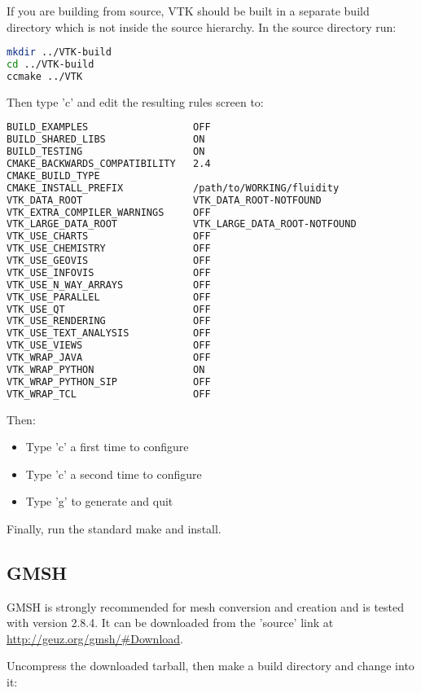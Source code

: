 If you are building from source, VTK should be built in a separate build
directory which is not inside the source hierarchy. In the source directory
run:

\begin{lstlisting}[language=bash]
mkdir ../VTK-build
cd ../VTK-build
ccmake ../VTK
\end{lstlisting}

Then type 'c' and edit the resulting rules screen to:

\begin{lstlisting}[language=bash]
BUILD_EXAMPLES                  OFF
BUILD_SHARED_LIBS               ON
BUILD_TESTING                   ON
CMAKE_BACKWARDS_COMPATIBILITY   2.4
CMAKE_BUILD_TYPE
CMAKE_INSTALL_PREFIX            /path/to/WORKING/fluidity
VTK_DATA_ROOT                   VTK_DATA_ROOT-NOTFOUND
VTK_EXTRA_COMPILER_WARNINGS     OFF
VTK_LARGE_DATA_ROOT             VTK_LARGE_DATA_ROOT-NOTFOUND
VTK_USE_CHARTS                  OFF
VTK_USE_CHEMISTRY               OFF
VTK_USE_GEOVIS                  OFF
VTK_USE_INFOVIS                 OFF
VTK_USE_N_WAY_ARRAYS            OFF
VTK_USE_PARALLEL                OFF
VTK_USE_QT                      OFF
VTK_USE_RENDERING               OFF
VTK_USE_TEXT_ANALYSIS           OFF
VTK_USE_VIEWS                   OFF
VTK_WRAP_JAVA                   OFF
VTK_WRAP_PYTHON                 ON
VTK_WRAP_PYTHON_SIP             OFF
VTK_WRAP_TCL                    OFF
\end{lstlisting}

Then:

\begin{itemize}
  \item Type 'c' a first time to configure
  \item Type 'c' a second time to configure
  \item Type 'g' to generate and quit
\end{itemize}

Finally, run the standard make and install.

\subsection{GMSH}
\label{sec:required_libraries_gmsh}

GMSH is strongly recommended for mesh conversion and creation and is tested
with version 2.8.4. It can be downloaded from the 'source' link at
\url{http://geuz.org/gmsh/#Download}.

Uncompress the downloaded tarball, then make a build directory and change into
it:


